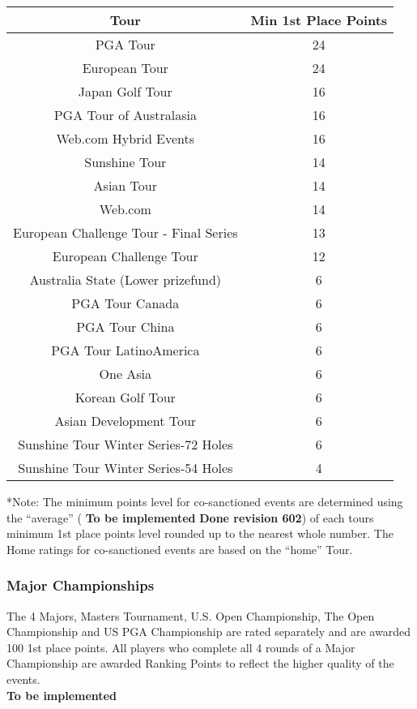 \documentclass{article}
\begin{document}
\begin{center}
\begin{tabular}{ | c | c | }
\hline

Tour &	Min 1st Place Points\\
\hline
PGA Tour	&24\\
European Tour	&24\\
Japan Golf Tour&	16\\
PGA Tour of Australasia&	16\\
 Web.com Hybrid Events	&16\\
Sunshine Tour	&14\\
Asian Tour	&14\\
Web.com	&14\\
European Challenge Tour - Final Series	&13 \\
European Challenge Tour	&12\\
Australia State (Lower prizefund)&	6\\
PGA Tour Canada	&6\\
PGA Tour China	&6\\
PGA Tour LatinoAmerica&	6\\
One Asia	&6\\
Korean Golf Tour&	6\\
Asian Development Tour&	6\\
Sunshine Tour Winter Series-72 Holes&	6\\
Sunshine Tour Winter Series-54 Holes	&4\\
\hline
\end{tabular}
\end{center}

*Note: The minimum points level for co-sanctioned events are determined using the “average” (
\textbf{\color{orange} To be implemented} \textbf{Done revision 602}) of each tours minimum 1st place points level rounded up to the nearest whole number. The Home ratings for co-sanctioned events are based on the “home” Tour.

\subsubsection{Major Championships}

The 4 Majors, Masters Tournament, U.S. Open Championship, The Open Championship and US PGA Championship are rated separately and are awarded 100 1st place points. All players who complete all 4 rounds of a Major Championship are awarded Ranking Points to reflect the higher quality of the events.\\
\textbf{\color{orange} To be implemented}
\end{document}
